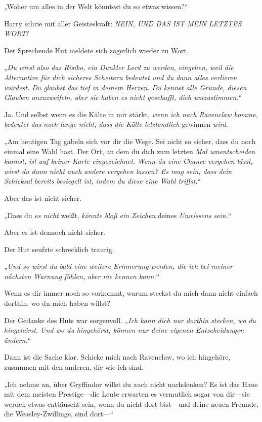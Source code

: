 {„Woher um alles in der Welt könntest du so etwas wissen?“

Harry schrie mit aller Geisteskraft: \emph{NEIN, UND DAS IST MEIN LETZTES WORT!}

Der Sprechende Hut meldete sich zögerlich wieder zu Wort.

„\emph{Du wirst also das Risiko, ein Dunkler Lord zu werden, eingehen, weil die Alternative für dich sicheres Scheitern bedeutet und du dann alles verlieren würdest. Du glaubst das tief in deinem Herzen. Du kennst alle Gründe, diesen Glauben anzuzweifeln, aber sie haben es nicht geschafft, dich umzustimmen.}“

Ja. Und selbst wenn es die Kälte in mir stärkt, \emph{wenn ich nach Ravenclaw komme, bedeutet das noch lange nicht, dass die Kälte letztendlich} gewinnen \emph{wird}.

„Am heutigen Tag gabeln sich vor dir die Wege. Sei nicht so sicher, dass du noch einmal eine Wahl hast. Der Ort, an dem du dich zum letzten \emph{Mal umentscheiden kannst, ist auf keiner Karte eingezeichnet. Wenn du eine Chance vergehen lässt, wirst du dann nicht auch andere vergehen lassen? Es mag sein, dass dein Schicksal bereits besiegelt ist, indem du diese eine Wahl triffst.}“

Aber das ist nicht sicher.

„Dass du \emph{es nicht} weißt, \emph{könnte bloß ein Zeichen} deines \emph{Unwissens sein.}“

Aber es ist dennoch nicht sicher.

Der Hut seufzte schrecklich traurig.

„\emph{Und so wirst du bald eine weitere Erinnerung werden, die ich bei meiner nächsten Warnung fühlen, aber nie kennen kann.}“

Wenn es dir immer noch so vorkommt, warum steckst du mich dann nicht einfach dorthin, wo du mich haben willst?

Der Gedanke des Huts war sorgenvoll. „\emph{Ich kann dich nur dorthin stecken, wo du hingehörst. Und wo du hingehörst, können nur deine eigenen Entscheidungen ändern.}“

Dann ist die Sache klar. Schicke mich nach Ravenclaw, wo ich hingehöre, zusammen mit den anderen, die wie ich sind.

„Ich nehme an, über Gryffindor willst du auch nicht nachdenken? Es ist das Haus mit dem meisten Prestige—die Leute erwarten es vermutlich sogar von dir—sie werden etwas enttäuscht sein, wenn du nicht dort bist—und deine neuen Freunde, die Weasley-Zwillinge, sind dort—“

}

